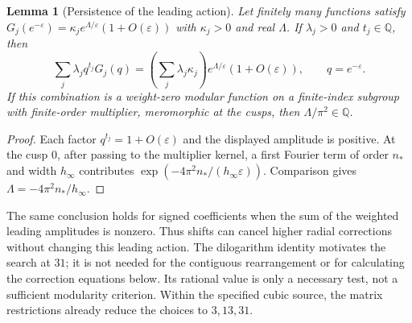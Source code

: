 \documentclass[11pt,reqno]{amsart}
\newcommand{\QQ}{\mathbb Q}
\newtheorem{lemma}[theorem]{Lemma}
\theoremstyle{remark}
\numberwithin{equation}{section}
\begin{document}
\begin{lemma}[Persistence of the leading action]\label{lem:persistence}
Let finitely many functions satisfy
$G_j(e^{-\varepsilon})=\kappa_j e^{\Lambda/\varepsilon}
(1+O(\varepsilon))$ with $\kappa_j>0$ and real $\Lambda$.
If $\lambda_j>0$ and $t_j\in\QQ$, then
\[
 \sum_j\lambda_jq^{t_j}G_j(q)
 =\left(\sum_j\lambda_j\kappa_j\right)
 e^{\Lambda/\varepsilon}(1+O(\varepsilon)),\qquad q=e^{-\varepsilon}.
\]
If this combination is a weight-zero modular function on a finite-index
subgroup with finite-order multiplier, meromorphic at the cusps, then
$\Lambda/\pi^2\in\QQ$.
\end{lemma}
\begin{proof}
Each factor $q^{t_j}=1+O(\varepsilon)$ and the displayed amplitude
is positive. At the cusp $0$, after passing to the multiplier kernel,
a first Fourier term of order $n_*$ and width $h_\infty$ contributes
$\exp(-4\pi^2n_*/(h_\infty\varepsilon))$.
Comparison gives $\Lambda=-4\pi^2n_*/h_\infty$.
\end{proof}

The same conclusion holds for signed coefficients when the sum of the
weighted leading amplitudes is nonzero. Thus shifts can cancel higher
radial corrections without changing this leading action. The
dilogarithm identity motivates the search at $31$; it is not needed
for the contiguous rearrangement or for calculating the correction
equations below. Its rational value is only a necessary test, not a
sufficient modularity criterion. Within the specified cubic source,
the matrix restrictions already reduce the choices to $3,13,31$.
\end{document}
